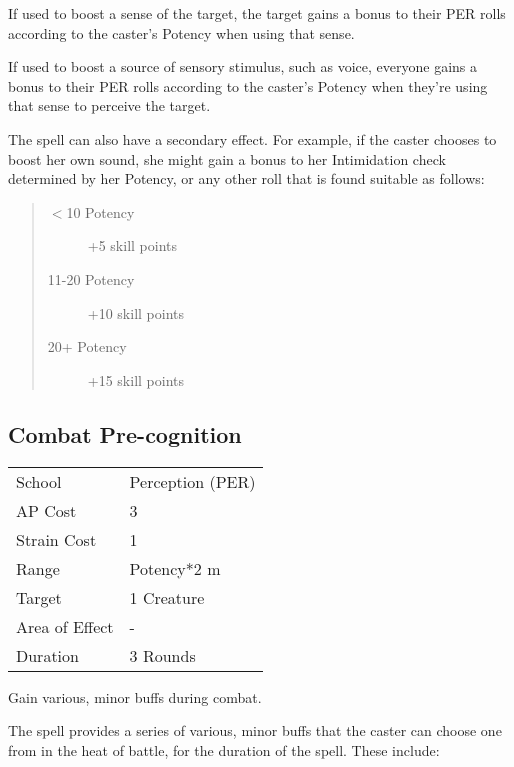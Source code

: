 \documentclass[11pt,a4paper,twocolumn]{book}
\begin{document}
If used to boost a sense of the target, the target gains a bonus to their PER rolls according to the caster's Potency when using that sense.

If used to boost a source of sensory stimulus, such as voice, everyone gains a bonus to their PER rolls according to the caster's Potency when they're using that sense to perceive the target.

The spell can also have a secondary effect. For example, if the caster chooses to boost her own sound, she might gain a bonus to her Intimidation check determined by her Potency, or any other roll that is found suitable as follows:

\begin{quote}
	\begin{description}
		\item[$<$10 Potency] 	+5 skill points
		\item[11-20 Potency] 	+10 skill points
		\item[20+ Potency] 	    +15 skill points
	\end{description}	
\end{quote}

\vfill

\subsection*{Combat Pre-cognition} 
{
	\begin{tabu} to 75mm{| X[l,4] | X[l,7] |}
		\hline
		School 			& Perception (PER) \\
		AP Cost	      	& 3 					\\
		Strain Cost     & 1 					\\
		Range     		& Potency*2 m			\\
		Target      	& 1 Creature 			\\
		Area of Effect  & - 	 				\\
		Duration     	& 3 Rounds 			\\ \hline
	\end{tabu}
	
}

\medskip

Gain various, minor buffs during combat.

The spell provides a series of various, minor buffs that the caster can choose one from in the heat of battle, for the duration of the spell. These include:
\end{document}
